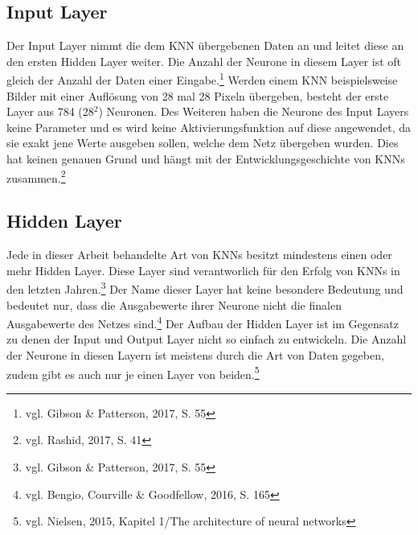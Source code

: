 \documentclass[a4paper,12pt,ngerman,oneside]{scrreprt}	%
\begin{document}
			\subsection{Input Layer}
			Der Input Layer nimmt die dem KNN übergebenen Daten an und leitet diese an den ersten Hidden Layer weiter. Die Anzahl der Neurone in diesem Layer ist oft gleich der Anzahl der Daten einer Eingabe.\footnote{vgl. Gibson \& Patterson, 2017, S. 55} Werden einem KNN beispielsweise Bilder mit einer Auflösung von 28 mal 28 Pixeln übergeben, besteht der erste Layer aus 784 (28$^2$) Neuronen. Des Weiteren haben die Neurone des Input Layers keine Parameter und es wird keine Aktivierungsfunktion auf diese angewendet, da sie exakt jene Werte ausgeben sollen, welche dem Netz übergeben wurden. Dies hat keinen genauen Grund und hängt mit der Entwicklungsgeschichte von KNNs zusammen.\footnote{vgl. Rashid, 2017, S. 41}
			\subsection{Hidden Layer}
			Jede in dieser Arbeit behandelte Art von KNNs besitzt mindestens einen oder mehr Hidden Layer. Diese Layer sind verantworlich für den Erfolg von KNNs in den letzten Jahren.\footnote{vgl. Gibson \& Patterson, 2017, S. 55} Der Name dieser Layer hat keine besondere Bedeutung und bedeutet nur, dass die Ausgabewerte ihrer Neurone nicht die finalen Ausgabewerte des Netzes sind.\footnote{vgl. Bengio, Courville \& Goodfellow, 2016, S. 165} Der Aufbau der Hidden Layer ist im Gegensatz zu denen der Input und Output Layer nicht so einfach zu entwickeln. Die Anzahl der Neurone in diesen Layern ist meistens durch die Art von Daten gegeben, zudem gibt es auch nur je einen Layer von beiden.\footnote{vgl. Nielsen, 2015, Kapitel 1/The architecture of neural networks}
\end{document}
